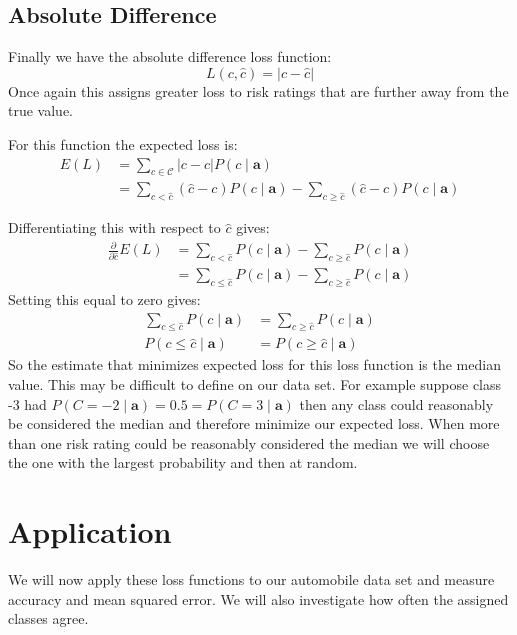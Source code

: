 \subsection{Absolute Difference}
Finally we have the absolute difference loss function:
\begin{equation}
	L(c, \hat{c}) = | c - \hat{c} |
\end{equation}
Once again this assigns greater loss to risk ratings that are further away from the true value.

For this function the expected loss is:
\begin{align}
	E(L) & = \sum_{c \in \mathcal{C}} |c - \hat{c}|P(c \mid \mathbf{a}) \\
	     & = \sum_{c < \hat{c}} (\hat{c} - c)P(c \mid \mathbf{a}) - \sum_{c \geq \hat{c}} (\hat{c} - c)P(c \mid \mathbf{a})
\end{align}

Differentiating this with respect to $\hat{c}$ gives:
\begin{align}
	\frac{\partial}{\partial \hat{c}} E(L) & = \sum_{c < \hat{c}} P(c \mid \mathbf{a}) - \sum_{c \geq \hat{c}} P(c \mid \mathbf{a}) \\
	& = \sum_{c \leq \hat{c}} P(c \mid \mathbf{a}) - \sum_{c \geq \hat{c}} P(c \mid \mathbf{a})
\end{align}
Setting this equal to zero gives:
\begin{align}
	\sum_{c \leq \hat{c}} P(c \mid \mathbf{a}) & = \sum_{c \geq \hat{c}} P(c \mid \mathbf{a}) \\
	P(c \leq \hat{c} \mid \mathbf{a}) & = P(c \geq \hat{c} \mid \mathbf{a})
\end{align}
So the estimate that minimizes expected loss for this loss function is the median value.
This may be difficult to define on our data set.
For example suppose class -3 had $P(C = -2 \mid \mathbf{a}) = 0.5 = P(C=3 \mid \mathbf{a})$ then any class could reasonably be considered the median and therefore minimize our expected loss.
When more than one risk rating could be reasonably considered the median we will choose the one with the largest probability and then at random.

\section{Application}
We will now apply these loss functions to our automobile data set and measure accuracy and mean squared error.
We will also investigate how often the assigned classes agree.

